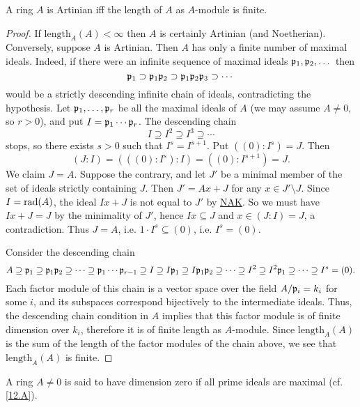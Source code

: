 \documentclass[../main]{subfiles}
\begin{document}
\begin{parproposition*}
A ring $A$ is Artinian iff the length of $A$ as $A$-module is finite.
\end{parproposition*}
\begin{proof}
If $\mathrm{length}_A(A)<\infty$ then $A$ is certainly Artinian (and Noetherian). Conversely, suppose $A$ is Artinian. Then $A$ has only a finite number of maximal ideals. Indeed, if there were an infinite sequence of maximal ideals $\mathfrak{p}_1,\mathfrak{p}_2,\dots$ then \[\mathfrak{p}_1\supset \mathfrak{p}_1\mathfrak{p}_2\supset \mathfrak{p}_1\mathfrak{p}_2\mathfrak{p}_3\supset\cdots\]would be a strictly descending infinite chain of ideals, contradicting the hypothesis. Let $\mathfrak{p}_1,\dots,\mathfrak{p}_r$ be all the maximal ideals of $A$ (we may assume $A\neq 0$, so $r>0$), and put $I=\mathfrak{p}_1\cdots \mathfrak{p}_r$. The descending chain \[I\supseteq I^2\supseteq I^3\supseteq\cdots \]stops, so there exists $s>0$ such that $I^s=I^{s+1}$. Put $((0):I^s)=J$. Then \[(J:I)=(((0):I^s):I)=((0):I^{s+1})=J.\]We claim $J=A$. Suppose the contrary, and let $J'$ be a minimal member of the set of ideals strictly containing $J$. Then $J'=Ax+J$ for any $x\in J'\setminus J$. Since $I=\operatorname{rad}(A)$, the ideal $Ix+J$ is not equal to $J'$ by \hyperref[NAK]{NAK}. So we must have $Ix+J=J$ by the minimality of $J'$, hence $Ix\subseteq J$ and $x\in (J:I)=J$, a contradiction. Thus $J=A$, i.e. $1\cdot I^s\subseteq (0)$, i.e. $I^s=(0)$.

Consider the descending chain \[A\supseteq\mathfrak{p}_1\supseteq\mathfrak{p}_1\mathfrak{p}_2\supseteq\cdots\supseteq\mathfrak{p}_1\cdots\mathfrak{p}_{r-1}\supseteq I\supseteq I\mathfrak{p}_1\supseteq I\mathfrak{p}_1\mathfrak{p}_2\supseteq\cdots\supseteq I^2\supseteq I^2\mathfrak{p}_1\supseteq\cdots\supseteq I^s=(0).\]Each factor module of this chain is a vector space over the field $A/\mathfrak{p}_i=k_i$ for some $i$, and its subspaces correspond bijectively to the intermediate ideals. Thus, the descending chain condition in $A$ implies that this factor module is of finite dimension over $k_i$, therefore it is of finite length as $A$-module. Since $\mathrm{length}_A(A)$ is the sum of the length of the factor modules of the chain above, we see that $\mathrm{length}_A(A)$ is finite.
\end{proof}

A ring $A\neq 0$ is said to have dimension zero if all prime ideals are maximal (cf. \ref{12.A}).
\end{document}
